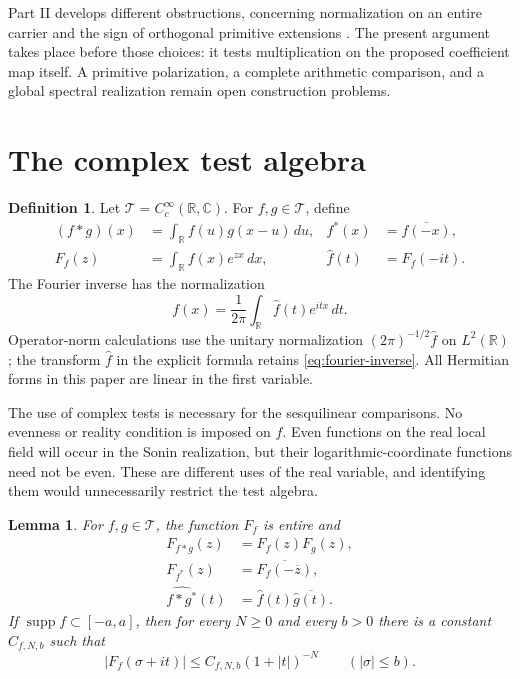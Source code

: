 \documentclass[11pt,letterpaper]{article}
\newtheorem{lemma}[theorem]{Lemma}
\theoremstyle{definition}
\newtheorem{definition}[theorem]{Definition}
\theoremstyle{remark}
\newcommand{\R}{\mathbb R}
\newcommand{\C}{\mathbb C}
\newcommand{\T}{\mathcal T}
\newcommand{\supp}{\operatorname{supp}}
\begin{document}
Part II develops different obstructions, concerning normalization on an
entire carrier and the sign of orthogonal primitive extensions
\cite{PartII}. The present argument takes place before those choices:
it tests multiplication on the proposed coefficient map itself. A
primitive polarization, a complete arithmetic comparison, and a global
spectral realization remain open construction problems.

\section{The complex test algebra}

\begin{definition}\label{def:local-correspondence:test-algebra}
Let $\T=C_c^\infty(\R,\C)$. For $f,g\in\T$, define
\begin{align}
 (f*g)(x)&=\int_\R f(u)g(x-u)\,du, &
 f^*(x)&=\overline{f(-x)},\label{eq:test-operations}\\
 F_f(z)&=\int_\R f(x)e^{zx}\,dx, &
 \widehat f(t)&=F_f(-it).\label{eq:test-transforms}
\end{align}
The Fourier inverse has the normalization
\begin{equation}\label{eq:fourier-inverse}
 f(x)=\frac1{2\pi}\int_\R\widehat f(t)e^{itx}\,dt.
\end{equation}
Operator-norm calculations use the unitary normalization
$(2\pi)^{-1/2}\widehat f$ on $L^2(\R)$; the transform
$\widehat f$ in the explicit formula retains
\eqref{eq:fourier-inverse}. All Hermitian forms in this paper
are linear in the first variable.
\end{definition}

The use of complex tests is necessary for the sesquilinear comparisons.
No evenness or reality condition is imposed on $f$. Even functions on
the real local field will occur in the Sonin realization, but their
logarithmic-coordinate functions need not be even. These are different
uses of the real variable, and identifying them would unnecessarily
restrict the test algebra.

\begin{lemma}\label{lem:test-identities}
For $f,g\in\T$, the function $F_f$ is entire and
\begin{align}
 F_{f*g}(z)&=F_f(z)F_g(z),\label{eq:laplace-convolution}\\
 F_{f^*}(z)&=\overline{F_f(-\overline z)},\label{eq:laplace-star}\\
 \widehat{f*g^*}(t)&=\widehat f(t)\overline{\widehat g(t)}.
 \label{eq:fourier-correlation}
\end{align}
If $\supp f\subset[-a,a]$, then for every $N\ge0$ and every $b>0$
there is a constant $C_{f,N,b}$ such that
\begin{equation}\label{eq:strip-decay}
 |F_f(\sigma+it)|\le C_{f,N,b}(1+|t|)^{-N}
 \qquad (|\sigma|\le b).
\end{equation}
\end{lemma}
\end{document}
